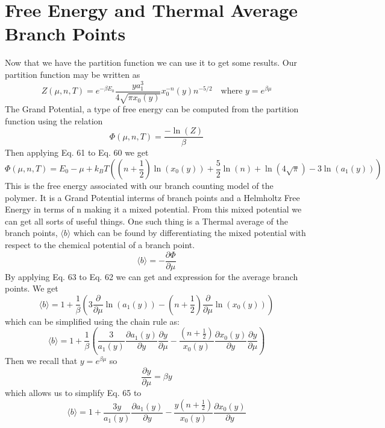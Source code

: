 \documentclass{article}
\begin{document}
\section{Free Energy and Thermal Average Branch Points}
Now that we have the partition function we can use it to get some results. Our partition function may be written as 
\begin{equation}
Z(\mu, n, T)=e^{-\beta E_0}  \frac{ya_1^3}{4\sqrt{\pi x_0(y)}}x_0^{-n}(y)n^{-5/2} \quad \text{where } y=e^{\beta \mu}
\end{equation}
The Grand Potential, a type of free energy can be computed from the partition function using the relation
\begin{equation}
\Phi(\mu, n , T)=\frac{-\ln(Z)}{\beta}
\end{equation}
Then applying Eq. 61 to Eq. 60 we get
\begin{equation}
\Phi(\mu,n,T)=E_0-\mu+k_BT\left((n+\frac{1}{2})\ln(x_0(y))+\frac{5}{2}\ln(n)+\ln(4\sqrt{\pi})-3\ln(a_1(y))\right)
\end{equation}
This is the free energy associated with our branch counting model of the polymer. It is a Grand Potential interms of branch points and a Helmholtz Free Energy in terms of n making it a mixed potential. From this mixed potential we can get all sorts of useful things. One such thing is a Thermal average of the branch points, \(\langle b\rangle\) which can be found by differentiating the mixed potential with respect to the chemical potential of a branch point. 
\begin{equation}
\langle b\rangle =-\frac{\partial \Phi}{\partial \mu}
\end{equation}
By applying Eq. 63 to Eq. 62 we can get and expression for the average branch points. We get
\begin{equation}
\langle b\rangle =1+\frac{1}{\beta}\left( 3\frac{\partial}{\partial \mu}\ln(a_1(y))-(n+\frac{1}{2})\frac{\partial}{\partial \mu} \ln(x_0(y))\right)
\end{equation}which can be simplified using the chain rule as:
\begin{equation}
\langle b\rangle =1+\frac{1}{\beta}\left( \frac{3}{a_1(y)}\frac{\partial a_1(y)}{\partial y}\frac{\partial y}{\partial \mu}-\frac{(n+\frac{1}{2})}{x_0(y)}\frac{\partial x_0(y)}{\partial y}\frac{\partial y}{\partial \mu} \right)
\end{equation}
Then we recall that \(y=e^{\beta \mu}\) so \[\frac{\partial y}{\partial \mu}=\beta y\] which allows us to simplify Eq. 65 to 
\begin{equation}
\langle b\rangle =1+ \frac{3y}{a_1(y)}\frac{\partial a_1(y)}{\partial y}-\frac{y(n+\frac{1}{2})}{x_0(y)}\frac{\partial x_0(y)}{\partial y}
\end{equation}
\end{document}
